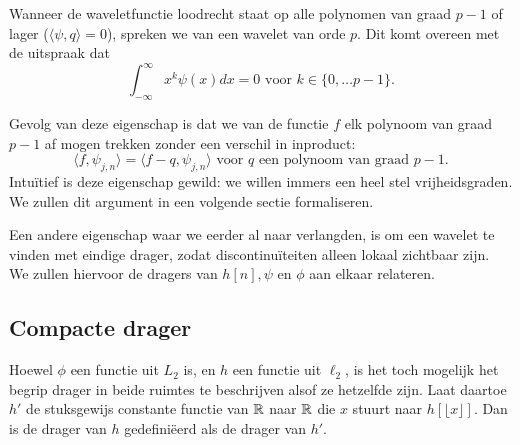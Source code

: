 \begin{definitie}
  Wanneer de waveletfunctie loodrecht staat op alle polynomen van graad $p-1$ of lager ($\langle \psi, q\rangle = 0$), 
  spreken we van een wavelet van orde $p$. Dit komt overeen met de uitspraak dat
  \[
  \int_{-\infty}^\infty x^k \psi(x) dx = 0 \text{ voor } k \in \{ 0, \ldots p-1 \}.
  \]
\end{definitie}

Gevolg van deze eigenschap is dat we van de functie $f$ elk polynoom van graad $p-1$ af mogen trekken zonder een verschil in inproduct:
\[
\langle f, \psi_{j,n} \rangle = \langle f - q, \psi_{j,n} \rangle \text{ voor $q$ een polynoom van graad $p-1$}.
\]
Intu\"itief is deze eigenschap gewild: we willen immers een heel stel vrijheidsgraden. 
We zullen dit argument in een volgende sectie formaliseren.

Een andere eigenschap waar we eerder al naar verlangden, is om een wavelet te vinden met eindige drager, 
zodat discontinu\"iteiten alleen lokaal zichtbaar zijn. 
We zullen hiervoor de dragers van $h[n], \psi$ en $\phi$ aan elkaar relateren.

\subsection{Compacte drager}
Hoewel $\phi$ een functie uit $L_2$ is, en $h$ een functie uit $\ell_2$, is het toch mogelijk het begrip drager in beide ruimtes te beschrijven alsof ze hetzelfde zijn. Laat daartoe $h'$ de stuksgewijs constante functie van $\mathbb{R}$ naar $\mathbb{R}$ die $x$ stuurt naar $h\left [\lfloor x \rfloor\right ]$. Dan is de drager van $h$ gedefini\"eerd als de drager van $h'$.

